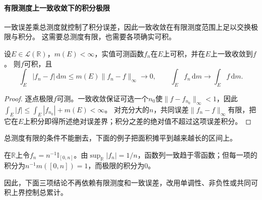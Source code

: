 \paragraph{有限测度上一致收敛下的积分极限}
\label{sec:analysis-classical-limit-integral}
一致误差乘总测度就控制了积分误差，因此一致收敛在有限测度范围上足以交换极限与积分。
这需要总测度有限，也需要各项确实可积。
\begin{theorem}[有限测度上的一致收敛与积分]
\label{thm:analysis-uniform-lebesgue-integral-limit}
设$E\in\mathcal L(\mathbb R)$，$m(E)<\infty$，实值可测函数$f_n$在$E$上可积，并在$E$上一致收敛到$f$。
则$f$可积，且
\begin{equation}
 \int_E|f_n-f|\,\mathrm dm
 \leq m(E)\|f_n-f\|_\infty\longrightarrow0,
 \qquad \int_Ef_n\,\mathrm dm\longrightarrow\int_Ef\,\mathrm dm.
\label{eq:analysis-uniform-riemann-limit}
\end{equation}
\end{theorem}
\begin{proof}
逐点极限$f$可测。一致收敛保证可选一个$n_0$使$\|f-f_{n_0}\|_\infty<1$，因此
$\int_E|f|\leq\int_E|f_{n_0}|+m(E)<\infty$。
对充分大的$n$，共同误差$\|f_n-f\|_\infty$有限，把它在$E$上积分即得所述绝对误差界；积分之差的绝对值不超过这项误差积分。
\end{proof}
总测度有限的条件不能删去，下面的例子把面积摊平到越来越长的区间上。
\begin{example}[无限测度上一致趋零而积分不变]
\label{ex:analysis-flattened-indicators}
在$\mathbb R$上令$f_n=n^{-1}\mathbb I_{[0,n]}$。由$\sup_{\mathbb R}|f_n|=1/n$，函数列一致趋于零函数；但每一项的积分为$n^{-1}m([0,n])=1$，而极限的积分为$0$。
\end{example}
因此，下面三项结论不再依赖有限测度和一致误差，改用单调性、非负性或共同可积上界控制总累计。

